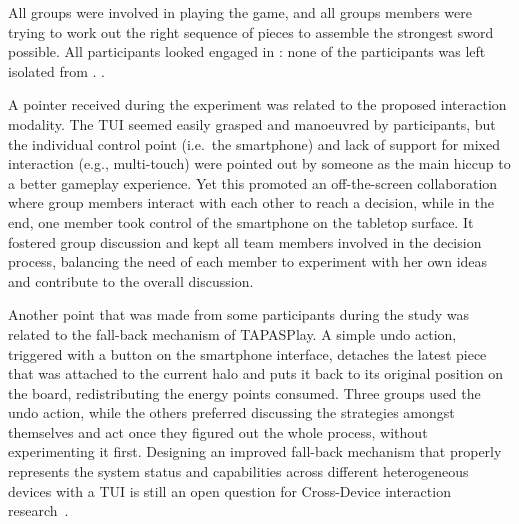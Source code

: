 All groups were involved in playing the game, and all groups members were trying to work out the right sequence of pieces to assemble the strongest sword possible. All participants looked engaged in : none of the participants was left isolated from . .

A pointer received during the experiment was related to the proposed interaction modality. The \ac{TUI} seemed easily grasped and manoeuvred by participants, but the individual control point (i.e.\ the smartphone) and lack of support for mixed interaction (e.g., multi-touch) were pointed out by someone as the main hiccup to a better gameplay experience. Yet this promoted an off-the-screen collaboration where group members interact with each other to reach a decision, while in the end, one member took control of the smartphone on the tabletop surface. It fostered group discussion and kept all team members involved in the decision process, balancing the need of each member to experiment with her own ideas and contribute to the overall discussion.

Another point that was made from some participants during the study was related to the fall-back mechanism of TAPASPlay. A simple undo action, triggered with a button on the smartphone interface, detaches the latest piece that was attached to the current halo and puts it back to its original position on the board, redistributing the energy points consumed. Three groups used the undo action, while the others preferred discussing the strategies amongst themselves and act once they figured out the whole process, without experimenting it first. Designing an improved fall-back mechanism that properly represents the system status and capabilities across different heterogeneous devices with a \ac{TUI} is still an open question for Cross-Device interaction research~\cite{Houben:2017:OCC:3135412.3121348}. 

